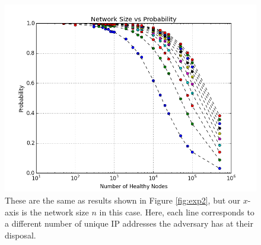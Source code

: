 \documentclass[a4paper]{article}
\begin{document}
\begin{figure}
\centering
\includegraphics[width=\linewidth]{size_prob_all}
\caption[a]{These are the same as results shown in Figure \ref{fig:exp2}, but our $x$-axis is the network size $n$ in this case.  
    Here, each line corresponds to a different number of unique IP addresses the adversary has at their disposal.}
\label{fig:size_prob_all}
\end{figure}
\end{document}
